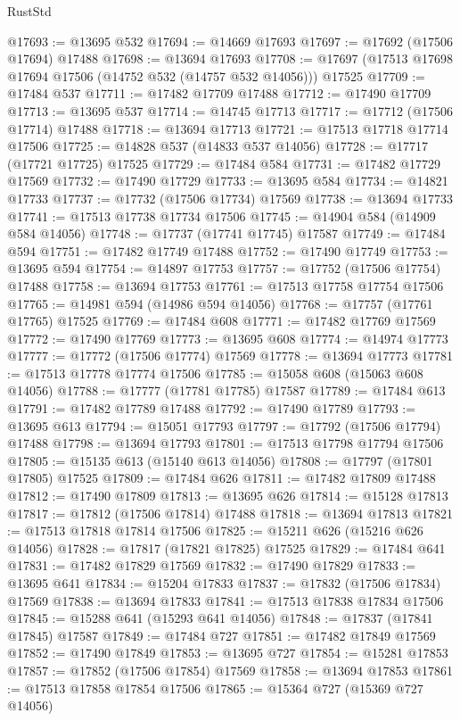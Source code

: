 \begin{lexlean}{RustStd}
\begin{coremodule}
@17693 := @13695 @532
@17694 := @14669 @17693
@17697 := @17692 (@17506 @17694) @17488
@17698 := @13694 @17693
@17708 := @17697 (@17513 @17698 @17694 @17506 (@14752 @532 (@14757 @532 @14056))) @17525
@17709 := @17484 @537
@17711 := @17482 @17709 @17488
@17712 := @17490 @17709
@17713 := @13695 @537
@17714 := @14745 @17713
@17717 := @17712 (@17506 @17714) @17488
@17718 := @13694 @17713
@17721 := @17513 @17718 @17714 @17506
@17725 := @14828 @537 (@14833 @537 @14056)
@17728 := @17717 (@17721 @17725) @17525
@17729 := @17484 @584
@17731 := @17482 @17729 @17569
@17732 := @17490 @17729
@17733 := @13695 @584
@17734 := @14821 @17733
@17737 := @17732 (@17506 @17734) @17569
@17738 := @13694 @17733
@17741 := @17513 @17738 @17734 @17506
@17745 := @14904 @584 (@14909 @584 @14056)
@17748 := @17737 (@17741 @17745) @17587
@17749 := @17484 @594
@17751 := @17482 @17749 @17488
@17752 := @17490 @17749
@17753 := @13695 @594
@17754 := @14897 @17753
@17757 := @17752 (@17506 @17754) @17488
@17758 := @13694 @17753
@17761 := @17513 @17758 @17754 @17506
@17765 := @14981 @594 (@14986 @594 @14056)
@17768 := @17757 (@17761 @17765) @17525
@17769 := @17484 @608
@17771 := @17482 @17769 @17569
@17772 := @17490 @17769
@17773 := @13695 @608
@17774 := @14974 @17773
@17777 := @17772 (@17506 @17774) @17569
@17778 := @13694 @17773
@17781 := @17513 @17778 @17774 @17506
@17785 := @15058 @608 (@15063 @608 @14056)
@17788 := @17777 (@17781 @17785) @17587
@17789 := @17484 @613
@17791 := @17482 @17789 @17488
@17792 := @17490 @17789
@17793 := @13695 @613
@17794 := @15051 @17793
@17797 := @17792 (@17506 @17794) @17488
@17798 := @13694 @17793
@17801 := @17513 @17798 @17794 @17506
@17805 := @15135 @613 (@15140 @613 @14056)
@17808 := @17797 (@17801 @17805) @17525
@17809 := @17484 @626
@17811 := @17482 @17809 @17488
@17812 := @17490 @17809
@17813 := @13695 @626
@17814 := @15128 @17813
@17817 := @17812 (@17506 @17814) @17488
@17818 := @13694 @17813
@17821 := @17513 @17818 @17814 @17506
@17825 := @15211 @626 (@15216 @626 @14056)
@17828 := @17817 (@17821 @17825) @17525
@17829 := @17484 @641
@17831 := @17482 @17829 @17569
@17832 := @17490 @17829
@17833 := @13695 @641
@17834 := @15204 @17833
@17837 := @17832 (@17506 @17834) @17569
@17838 := @13694 @17833
@17841 := @17513 @17838 @17834 @17506
@17845 := @15288 @641 (@15293 @641 @14056)
@17848 := @17837 (@17841 @17845) @17587
@17849 := @17484 @727
@17851 := @17482 @17849 @17569
@17852 := @17490 @17849
@17853 := @13695 @727
@17854 := @15281 @17853
@17857 := @17852 (@17506 @17854) @17569
@17858 := @13694 @17853
@17861 := @17513 @17858 @17854 @17506
@17865 := @15364 @727 (@15369 @727 @14056)

\end{coremodule}
\end{lexlean}
